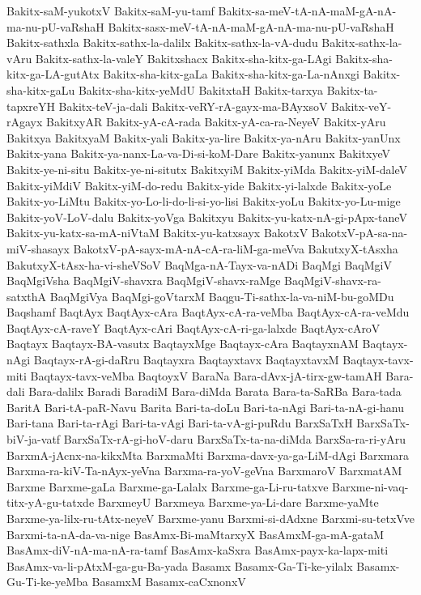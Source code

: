 {Bakitx-saM-yukotxV
Bakitx-saM-yu-tamf
Bakitx-sa-meV-tA-nA-maM-gA-nA-ma-nu-pU-vaRshaH
Bakitx-sasx-meV-tA-nA-maM-gA-nA-ma-nu-pU-vaRshaH
Bakitx-sathxla
Bakitx-sathx-la-dalilx
Bakitx-sathx-la-vA-dudu
Bakitx-sathx-la-vAru
Bakitx-sathx-la-valeY
Bakitxshacx
Bakitx-sha-kitx-ga-LAgi
Bakitx-sha-kitx-ga-LA-gutAtx
Bakitx-sha-kitx-gaLa
Bakitx-sha-kitx-ga-La-nAnxgi
Bakitx-sha-kitx-gaLu
Bakitx-sha-kitx-yeMdU
BakitxtaH
Bakitx-tarxya
Bakitx-ta-tapxreYH
Bakitx-teV-ja-dali
Bakitx-veRY-rA-gayx-ma-BAyxsoV
Bakitx-veY-rAgayx
BakitxyAR
Bakitx-yA-cA-rada
Bakitx-yA-ca-ra-NeyeV
Bakitx-yAru
Bakitxya
BakitxyaM
Bakitx-yali
Bakitx-ya-lire
Bakitx-ya-nAru
Bakitx-yanUnx
Bakitx-yana
Bakitx-ya-nanx-La-va-Di-si-koM-Dare
Bakitx-yanunx
BakitxyeV
Bakitx-ye-ni-situ
Bakitx-ye-ni-situtx
BakitxyiM
Bakitx-yiMda
Bakitx-yiM-daleV
Bakitx-yiMdiV
Bakitx-yiM-do-redu
Bakitx-yide
Bakitx-yi-lalxde
Bakitx-yoLe
Bakitx-yo-LiMtu
Bakitx-yo-Lo-li-do-li-si-yo-lisi
Bakitx-yoLu
Bakitx-yo-Lu-mige
Bakitx-yoV-LoV-dalu
Bakitx-yoVga
Bakitxyu
Bakitx-yu-katx-nA-gi-pApx-taneV
Bakitx-yu-katx-sa-mA-niVtaM
Bakitx-yu-katxsayx
BakotxV
BakotxV-pA-sa-na-miV-shasayx
BakotxV-pA-sayx-mA-nA-cA-ra-liM-ga-meVva
BakutxyX-tAsxha
BakutxyX-tAsx-ha-vi-sheVSoV
BaqMga-nA-Tayx-va-nADi
BaqMgi
BaqMgiV
BaqMgiVsha
BaqMgiV-shavxra
BaqMgiV-shavx-raMge
BaqMgiV-shavx-ra-satxthA
BaqMgiVya
BaqMgi-goVtarxM
Baqgu-Ti-sathx-la-va-niM-bu-goMDu
Baqshamf
BaqtAyx
BaqtAyx-cAra
BaqtAyx-cA-ra-veMba
BaqtAyx-cA-ra-veMdu
BaqtAyx-cA-raveY
BaqtAyx-cAri
BaqtAyx-cA-ri-ga-lalxde
BaqtAyx-cAroV
Baqtayx
Baqtayx-BA-vasutx
BaqtayxMge
Baqtayx-cAra
BaqtayxnAM
Baqtayx-nAgi
Baqtayx-rA-gi-daRru
Baqtayxra
Baqtayxtavx
BaqtayxtavxM
Baqtayx-tavx-miti
Baqtayx-tavx-veMba
BaqtoyxV
BaraNa
Bara-dAvx-jA-tirx-gw-tamAH
Bara-dali
Bara-dalilx
Baradi
BaradiM
Bara-diMda
Barata
Bara-ta-SaRBa
Bara-tada
BaritA
Bari-tA-paR-Navu
Barita
Bari-ta-doLu
Bari-ta-nAgi
Bari-ta-nA-gi-hanu
Bari-tana
Bari-ta-rAgi
Bari-ta-vAgi
Bari-ta-vA-gi-puRdu
BarxSaTxH
BarxSaTx-biV-ja-vatf
BarxSaTx-rA-gi-hoV-daru
BarxSaTx-ta-na-diMda
BarxSa-ra-ri-yAru
BarxmA-jAcnx-na-kikxMta
BarxmaMti
Barxma-davx-ya-ga-LiM-dAgi
Barxmara
Barxma-ra-kiV-Ta-nAyx-yeVna
Barxma-ra-yoV-geVna
BarxmaroV
BarxmatAM
Barxme
Barxme-gaLa
Barxme-ga-Lalalx
Barxme-ga-Li-ru-tatxve
Barxme-ni-vaq-titx-yA-gu-tatxde
BarxmeyU
Barxmeya
Barxme-ya-Li-dare
Barxme-yaMte
Barxme-ya-lilx-ru-tAtx-neyeV
Barxme-yanu
Barxmi-si-dAdxne
Barxmi-su-tetxVve
Barxmi-ta-nA-da-va-nige
BasAmx-Bi-maMtarxyX
BasAmxM-ga-mA-gataM
BasAmx-diV-nA-ma-nA-ra-tamf
BasAmx-kaSxra
BasAmx-payx-ka-lapx-miti
BasAmx-va-li-pAtxM-ga-gu-Ba-yada
Basamx
Basamx-Ga-Ti-ke-yilalx
Basamx-Gu-Ti-ke-yeMba
BasamxM
Basamx-caCxnonxV
}
